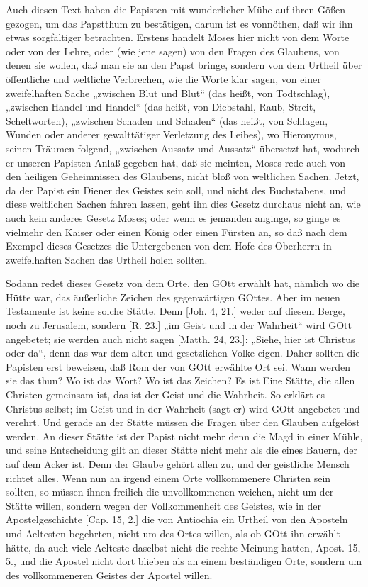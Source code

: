 Auch diesen Text haben die Papisten mit wunderlicher Mühe auf ihren Gößen gezogen, um das Papstthum zu bestätigen, darum ist es vonnöthen, daß wir ihn etwas sorgfältiger betrachten. Erstens handelt Moses hier nicht von dem Worte oder von der Lehre, oder (wie jene sagen) von den Fragen des Glaubens, von denen sie wollen, daß man sie an den Papst bringe, sondern von dem Urtheil über öffentliche und weltliche Verbrechen, wie die Worte klar sagen, von einer zweifelhaften Sache „zwischen Blut und Blut“ (das heißt, von Todtschlag), „zwischen Handel und Handel“ (das heißt, von Diebstahl, Raub, Streit, Scheltworten), „zwischen Schaden und Schaden“ (das heißt, von Schlagen, Wunden oder anderer gewalttätiger Verletzung des Leibes), wo Hieronymus, seinen Träumen folgend, „zwischen Aussatz und Aussatz“ übersetzt hat, wodurch er unseren Papisten Anlaß gegeben hat, daß sie meinten, Moses rede auch von den heiligen Geheimnissen des Glaubens, nicht bloß von weltlichen Sachen. Jetzt, da der Papist ein Diener des Geistes sein soll, und nicht des Buchstabens, und diese weltlichen Sachen fahren lassen, geht ihn dies Gesetz durchaus nicht an, wie auch kein anderes Gesetz Moses; oder wenn es jemanden anginge, so ginge es vielmehr den Kaiser oder einen König oder einen Fürsten an, so daß nach dem Exempel dieses Gesetzes die Untergebenen von dem Hofe des Oberherrn in zweifelhaften Sachen das Urtheil holen sollten.

Sodann redet dieses Gesetz von dem Orte, den GOtt erwählt hat, nämlich wo die Hütte war, das äußerliche Zeichen des gegenwärtigen GOttes. Aber im neuen Testamente ist keine solche Stätte. Denn [Joh. 4, 21.] weder auf diesem Berge, noch zu Jerusalem, sondern [R. 23.] „im Geist und in der Wahrheit“ wird GOtt angebetet; sie werden auch nicht sagen [Matth. 24, 23.]: „Siehe, hier ist Christus oder da“, denn das war dem alten und gesetzlichen Volke eigen. Daher sollten die Papisten erst beweisen, daß Rom der von GOtt erwählte Ort sei. Wann werden sie das thun? Wo ist das Wort? Wo ist das Zeichen? Es ist Eine Stätte, die allen Christen gemeinsam ist, das ist der Geist und die Wahrheit. So erklärt es Christus selbst; im Geist und in der Wahrheit (sagt er) wird GOtt angebetet und verehrt. Und gerade an der Stätte müssen die Fragen über den Glauben aufgelöst werden. An dieser Stätte ist der Papist nicht mehr denn die Magd in einer Mühle, und seine Entscheidung gilt an dieser Stätte nicht mehr als die eines Bauern, der auf dem Acker ist. Denn der Glaube gehört allen zu, und der geistliche Mensch richtet alles. Wenn nun an irgend einem Orte vollkommenere Christen sein sollten, so müssen ihnen freilich die unvollkommenen weichen, nicht um der Stätte willen, sondern wegen der Vollkommenheit des Geistes, wie in
der Apostelgeschichte [Cap. 15, 2.] die von Antiochia ein Urtheil von den Aposteln und Aeltesten begehrten, nicht um des Ortes willen, als ob GOtt ihn erwählt hätte, da auch viele Aelteste daselbst nicht die rechte Meinung hatten, Apost. 15, 5., und die Apostel nicht dort blieben als an einem beständigen Orte, sondern um des vollkommeneren Geistes der Apostel willen.

